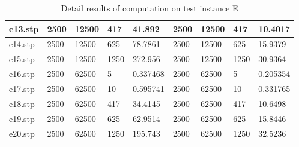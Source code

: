 \begin{table}[ht]
\begin{center}
\begin{tabular}{|l|l|l|l|l|l|l|l|l|}
 e13.stp &  2500      &  12500     &  417       &  41.892         &  2500      &  12500     &  417      &  10.4017        \\ \hline
 e14.stp &  2500      &  12500     &  625       &  78.7861        &  2500      &  12500     &  625      &  15.9379        \\ \hline
 e15.stp &  2500      &  12500     &  1250      &  272.956        &  2500      &  12500     &  1250     &  30.9364        \\ \hline
 e16.stp &  2500      &  62500     &  5         &  0.337468       &  2500      &  62500     &  5        &  0.205354       \\ \hline
 e17.stp &  2500      &  62500     &  10        &  0.595741       &  2500      &  62500     &  10       &  0.331765       \\ \hline
 e18.stp &  2500      &  62500     &  417       &  34.4145        &  2500      &  62500     &  417      &  10.6498        \\ \hline
 e19.stp &  2500      &  62500     &  625       &  62.9514        &  2500      &  62500     &  625      &  15.8446        \\ \hline
 e20.stp &  2500      &  62500     &  1250      &  195.743        &  2500      &  62500     &  1250     &  32.5236        \\ \hline
 
\end{tabular}
\end{center}
\caption{Detail results of computation on test instance E}
\end{table}



